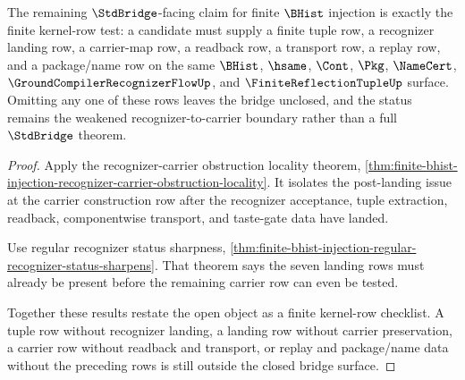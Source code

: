 \begin{theorem}
\label{thm:finite-bhist-injection-open-kernel-restatement}
The remaining $\StdBridge$-facing claim for finite $\BHist$ injection is exactly the finite kernel-row test: a candidate must supply a finite tuple row, a recognizer landing row, a carrier-map row, a readback row, a transport row, a replay row, and a package/name row on the same $\BHist$, $\hsame$, $\Cont$, $\Pkg$, $\NameCert$, $\GroundCompilerRecognizerFlowUp$, and $\FiniteReflectionTupleUp$ surface. Omitting any one of these rows leaves the bridge unclosed, and the status remains the weakened recognizer-to-carrier boundary rather than a full $\StdBridge$ theorem.
\end{theorem}
\begin{proof}
Apply the recognizer-carrier obstruction locality theorem, \autoref{thm:finite-bhist-injection-recognizer-carrier-obstruction-locality}. It isolates the post-landing issue at the carrier construction row after the recognizer acceptance, tuple extraction, readback, componentwise transport, and taste-gate data have landed.

Use regular recognizer status sharpness, \autoref{thm:finite-bhist-injection-regular-recognizer-status-sharpens}. That theorem says the seven landing rows must already be present before the remaining carrier row can even be tested.

Together these results restate the open object as a finite kernel-row checklist. A tuple row without recognizer landing, a landing row without carrier preservation, a carrier row without readback and transport, or replay and package/name data without the preceding rows is still outside the closed bridge surface.
\end{proof}

